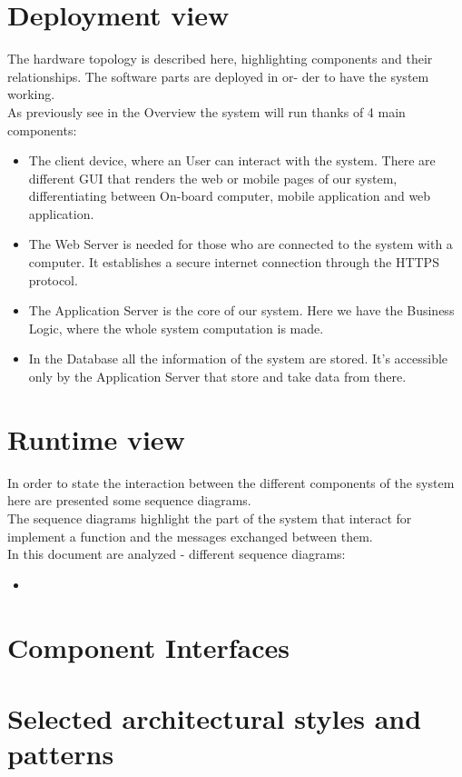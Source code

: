  \section{Deployment view}
The hardware topology is described here, highlighting components and their relationships. The software parts are deployed in or-
der to have the system working.
\\As previously see in the Overview the system will run thanks of 4 main components:
\begin{itemize}
	\item{The client device, where an User can interact with the system. There are different GUI that renders the web or mobile pages of our system, differentiating between On-board computer, mobile application and web application.}
	\item{ The Web Server is needed for those who are connected to the system with a computer. It establishes a secure internet connection through the HTTPS protocol.}
	\item{The Application Server is the core of our system. Here we have the Business Logic, where the whole system computation is
made.}
	\item{In the Database all the information of the system are stored. It's accessible only by the Application Server that store and take data from there.}
\end{itemize} 


 \section{Runtime view}

In order to state the interaction between the different components of the system here are presented some sequence diagrams.
\\The sequence diagrams highlight the part of the system that interact for implement a function and the messages exchanged between them.
\\In this document are analyzed - different sequence diagrams: %
\begin{itemize}%
	\item %
\end{itemize} 



 \section{Component Interfaces}
 	\blindtext
 \section{Selected architectural styles and patterns}
